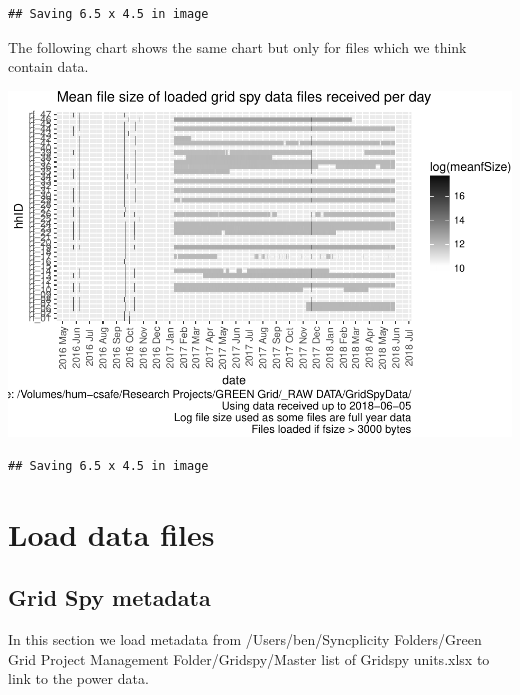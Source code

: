 \documentclass[]{article}
\begin{document}
\begin{verbatim}
## Saving 6.5 x 4.5 in image
\end{verbatim}

The following chart shows the same chart but only for files which we
think contain data.

\includegraphics{processGridSpy1minData_files/figure-latex/loadedFileSizesPlot-1.pdf}

\begin{verbatim}
## Saving 6.5 x 4.5 in image
\end{verbatim}

\section{Load data files}\label{load-data-files}

\subsection{Grid Spy metadata}\label{grid-spy-metadata}

In this section we load metadata from /Users/ben/Syncplicity
Folders/Green Grid Project Management Folder/Gridspy/Master list of
Gridspy units.xlsx to link to the power data.
\end{document}

